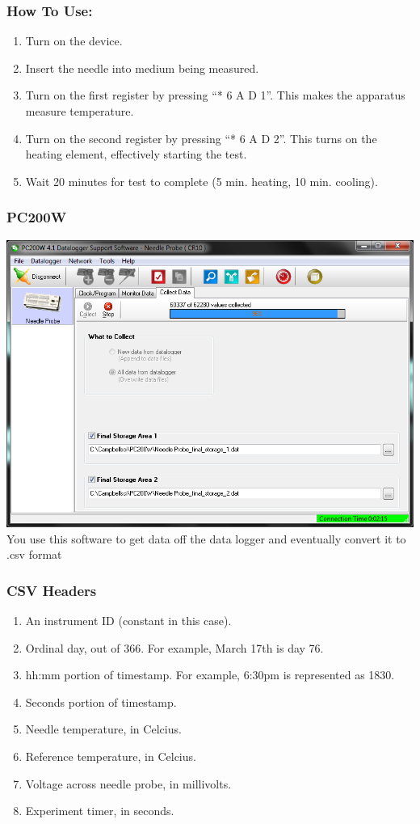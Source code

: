 \documentclass{beamer}
\begin{document}
\begin{frame}
\frametitle{How To Use:}
\begin{enumerate}
\item Turn on the device.
\item Insert the needle into medium being measured.
\item Turn on the first register by pressing ``* 6 A D 1''. This makes the
apparatus measure temperature.
\item Turn on the second register by pressing ``* 6 A D 2''. This turns on the
heating element, effectively starting the test.
\item Wait 20 minutes for test to complete (5 min. heating, 10 min. cooling).
\end{enumerate}
\end{frame}


\begin{frame}
\frametitle{PC200W}
\includegraphics[width=\textwidth]{fig/pc200w.png}\\
You use this software to get data off the data logger and eventually convert it
to .csv format
\end{frame}


\begin{frame}
\frametitle{CSV Headers}
\begin{enumerate}
\item An instrument ID (constant in this case).
\item Ordinal day, out of 366. For example, March 17th is day 76.
\item hh:mm portion of timestamp. For example, 6:30pm is represented as 1830.
\item Seconds portion of timestamp.
\item Needle temperature, in Celcius.
\item Reference temperature, in Celcius.
\item Voltage across needle probe, in millivolts.
\item Experiment timer, in seconds.
\end{enumerate}
\end{frame}
\end{document}
